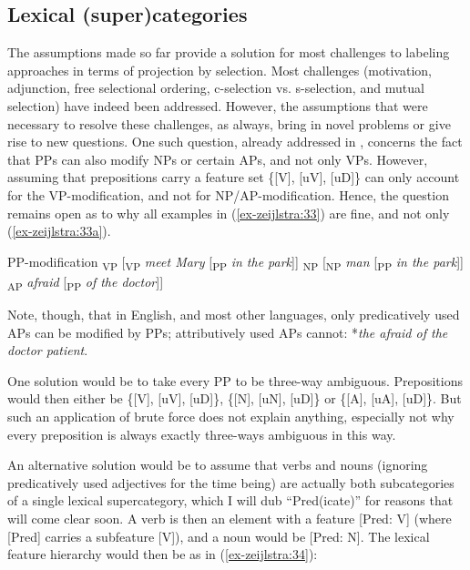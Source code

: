 \documentclass[output=paper
,modfonts
,nonflat]{langsci/langscibook}
\begin{document}
\subsection{Lexical (super)categories} \label{sec-zeijlstra:3.7}
The assumptions made so far provide a solution for most challenges to labeling approaches in terms of projection by selection. Most challenges (motivation, adjunction, free selectional ordering, c-selection vs. s-selection, and mutual selection) have indeed been addressed. However, the assumptions that were necessary to resolve these challenges, as always, bring in novel problems or give rise to new questions. One such question, already addressed in , concerns the fact that PPs can also modify NPs or certain APs, and not only VPs. However, assuming that prepositions carry a feature set \{[V], [uV], [uD]\} can only account for the VP-modification, and not for NP/AP-modification. Hence, the question remains open as to why all examples in (\ref{ex-zeijlstra:33}) are fine, and not only (\ref{ex-zeijlstra:33a}). 

\begin{exe}
\ex PP-modification \label{ex-zeijlstra:33}
	\xlist
	\ex {[}\textsubscript{VP} [\textsubscript{VP} \textit{meet Mary} [\textsubscript{PP} \textit{in the park}]{]} \label{ex-zeijlstra:33a}
	\ex {[}\textsubscript{NP} [\textsubscript{NP} \textit{man} [\textsubscript{PP} \textit{in the park}]{]}
	\ex {[}\textsubscript{AP} \textit{afraid} [\textsubscript{PP} \textit{of the doctor}]{]}
	\endxlist
\end{exe}
Note, though, that in English, and most other languages, only predicatively used APs can be modified by PPs; attributively used APs cannot: *\textit{the afraid of the doctor patient}.

One solution would be to take every PP to be three-way ambiguous. Prepositions would then either be \{[V], [uV], [uD]\}, \{[N], [uN], [uD]\} or \{[A], [uA], [uD]\}. But such an application of brute force does not explain anything, especially not why every preposition is always exactly three-ways ambiguous in this way.

An alternative solution would be to assume that verbs and nouns (ignoring predicatively used adjectives for the time being) are actually both subcategories of a single lexical supercategory, which I will dub ``Pred(icate)'' for reasons that will come clear soon. A verb is then an element with a feature [Pred: V] (where [Pred] carries a subfeature [V]), and a noun would be [Pred: N]. The lexical feature hierarchy would then be as in (\ref{ex-zeijlstra:34}):
\end{document}
